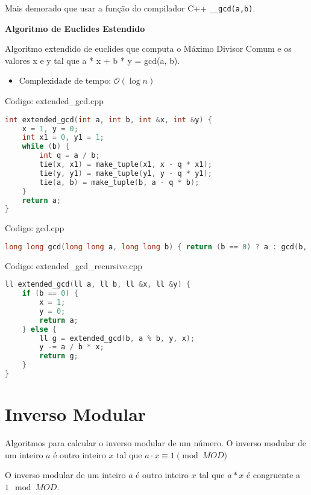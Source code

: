 \documentclass[10pt, a4paper, oneside]{book}
\begin{document}
Mais demorado que usar a função do compilador C++ \texttt{\_\_gcd(a,b)}.



\textbf{Algoritmo de Euclides Estendido} 



Algoritmo extendido de euclides que computa o Máximo Divisor Comum e os valores x e y tal que a * x + b * y = gcd(a, b).



\begin{itemize}
\item Complexidade de tempo: $\mathcal{O}(\log n)$
\end{itemize}

\hfill

Codigo: extended\_gcd.cpp

\begin{lstlisting}[language=C++]
int extended_gcd(int a, int b, int &x, int &y) {
    x = 1, y = 0;
    int x1 = 0, y1 = 1;
    while (b) {
        int q = a / b;
        tie(x, x1) = make_tuple(x1, x - q * x1);
        tie(y, y1) = make_tuple(y1, y - q * y1);
        tie(a, b) = make_tuple(b, a - q * b);
    }
    return a;
}
\end{lstlisting}
\hfill

Codigo: gcd.cpp

\begin{lstlisting}[language=C++]
long long gcd(long long a, long long b) { return (b == 0) ? a : gcd(b, a % b); }
\end{lstlisting}
\hfill

Codigo: extended\_gcd\_recursive.cpp

\begin{lstlisting}[language=C++]
ll extended_gcd(ll a, ll b, ll &x, ll &y) {
    if (b == 0) {
        x = 1;
        y = 0;
        return a;
    } else {
        ll g = extended_gcd(b, a % b, y, x);
        y -= a / b * x;
        return g;
    }
}
\end{lstlisting}
\hfill

\section{Inverso Modular}


Algoritmos para calcular o inverso modular de um número. O inverso modular de um inteiro $a$ é outro inteiro $x$ tal que $a \cdot x \equiv 1 \pmod{MOD}$



O inverso modular de um inteiro $a$ é outro inteiro $x$ tal que $a * x$ é congruente a $1 \mod MOD$.
\end{document}
